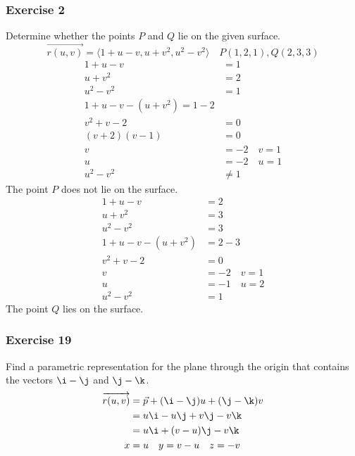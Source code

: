 \documentclass{math}
\begin{document}
\subsubsection*{Exercise 2}
Determine whether the points \( P \) and \( Q \) lie on the given surface.
\[ \overrightarrow{r(u,v)} = \langle1+u-v,u+v^2,u^2-v^2\rangle \quad
  P(1,2,1),Q(2,3,3) \]
\begin{align*}
  1+u-v &= 1 \\
  u+v^2 &= 2 \\
  u^2-v^2 &= 1 \\
  1+u-v-(u+v^2) = 1-2 \\
  v^2+v-2 &= 0 \\
  (v+2)(v-1) &= 0 \\
  v &= -2 \quad v = 1 \\
  u &= -2 \quad u = 1 \\
  u^2-v^2 &\ne 1
\end{align*}
The point \( P \) does not lie on the surface.
\begin{align*}
  1+u-v &= 2 \\
  u+v^2 &= 3 \\
  u^2-v^2 &= 3 \\
  1+u-v-(u+v^2) &= 2-3 \\
  v^2+v-2 &= 0 \\
  v &= -2 \quad v = 1 \\
  u &= -1 \quad u = 2 \\
  u^2-v^2 &= 1
\end{align*}
The point \( Q \) lies on the surface.

\subsubsection*{Exercise 19}
Find a parametric representation for the plane through the origin that contains
the vectors \( \i-\j \) and \( \j-\k \).
\begin{align*}
  \overrightarrow{r(u,v)} &= \vec{p}+(\i-\j)u+(\j-\k)v \\
  &= u\i-u\j+v\j-v\k \\
  &= u\i+(v-u)\j-v\k \\
  x &= u \quad y = v-u \quad z = -v \\
\end{align*}
\end{document}
